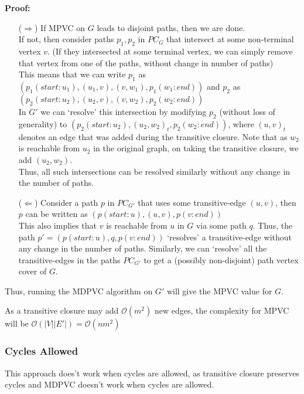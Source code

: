 \documentclass[11pt, fleqn]{article}
\begin{document}
\smallskip
\textbf{Proof:}
\begin{itemize}
    \item[($\Rightarrow$)] 
    If MPVC on $G$ leads to disjoint paths, then we are done.\\
    If not, then consider paths $p_1, p_2$ in $PC_G$ that intersect at some non-terminal vertex $v$. (If they intersected at some terminal vertex, we can simply remove that vertex from one of the paths, without change in number of paths)\\
    This means that we can write $p_1$ as $(p_1(start:u_1), (u_1, v), (v, w_1), p_1(w_1:end))$ and $p_2$ as $(p_2(start:u_2), (u_2, v), (v, w_2), p_2(w_2:end))$\\
    In $G'$ we can `resolve' this intersection by modifying $p_2$ (without loss of generality) to $(p_2(start:u_2), (u_2, w_2)_t, p_2(w_2:end))$, where $(u, v)_t$ denotes an edge that was added during the transitive closure. Note that as $w_2$ is reachable from $u_2$ in the original graph, on taking the transitive closure, we add $(u_2, w_2)$.\\
    Thus, all such intersections can be resolved similarly without any change in the number of paths.
    
    \item[($\Leftarrow$)]
    Consider a path $p$ in $PC_{G'}$ that uses some transitive-edge $(u, v)$, then $p$ can be written as $(p(start:u), (u,v), p(v:end))$\\
    This also implies that $v$ is reachable from $u$ in $G$ via some path $q$. Thus, the path $p' = (p(start:u), q, p(v:end))$ `resolves' a transitive-edge without any change in the number of paths. Similarly, we can `resolve' all the transitive-edges in the paths $PC_{G'}$ to get a (possibly non-disjoint) path vertex cover of $G$.
    
\end{itemize}
Thus, running the MDPVC algorithm on $G'$ will give the MPVC value for $G$.

\medskip
As a transitive closure may add $\mathcal{O}(m^2)$ new edges, the complexity for MPVC will be $\mathcal{O}(|V||E'|) = \mathcal{O}(nm^2)$

\subsubsection*{Cycles Allowed}
This approach does't work when cycles are allowed, as transitive closure preserves cycles and MDPVC doesn't work when cycles are allowed.
\end{document}
